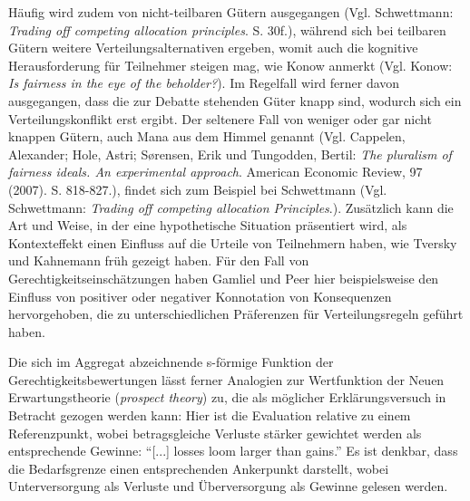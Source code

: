 \documentclass[a4paper]{thesis}
\begin{document}
{Häufig wird zudem von nicht-teilbaren Gütern ausgegangen (Vgl. Schwettmann: \textit{Trading off competing allocation principles}. S. 30f.), während sich bei teilbaren Gütern weitere Verteilungsalternativen ergeben, womit auch die kognitive Herausforderung für Teilnehmer steigen mag, wie Konow anmerkt (Vgl. Konow: \textit{Is fairness in the eye of the beholder?}). Im Regelfall wird ferner davon ausgegangen, dass die zur Debatte stehenden Güter knapp sind, wodurch sich ein Verteilungskonflikt erst ergibt. Der seltenere Fall von weniger oder gar nicht knappen Gütern, auch Mana aus dem Himmel genannt (Vgl. Cappelen, Alexander; Hole, Astri; Sørensen, Erik und Tungodden, Bertil: \textit{The pluralism of fairness ideals. An experimental approach}. American Economic Review, 97 (2007). S. 818-827.), findet sich zum Beispiel bei Schwettmann (Vgl. Schwettmann: \textit{Trading off competing allocation Principles}.).} Zusätzlich kann die Art und Weise, in der eine hypothetische Situation präsentiert wird, als Kontexteffekt einen Einfluss auf die Urteile von Teilnehmern haben, wie Tversky und Kahnemann früh gezeigt haben. Für den Fall von Gerechtigkeitseinschätzungen haben Gamliel und Peer hier beispielsweise den Einfluss von positiver oder negativer Konnotation von Konsequenzen hervorgehoben, die zu unterschiedlichen Präferenzen für Verteilungsregeln geführt haben.

Die sich im Aggregat abzeichnende s-förmige Funktion der Gerechtigkeitsbewertungen lässt ferner Analogien zur Wertfunktion der Neuen Erwartungstheorie (\textit{prospect theory}) zu, die als möglicher Erklärungsversuch in Betracht gezogen werden kann: Hier ist die Evaluation relative zu einem Referenzpunkt, wobei betragsgleiche Verluste stärker gewichtet werden als entsprechende Gewinne: \enquote{[...] losses loom larger than gains.} Es ist denkbar, dass die Bedarfsgrenze einen entsprechenden Ankerpunkt darstellt, wobei Unterversorgung als Verluste und Überversorgung als Gewinne gelesen werden.
\end{document}
